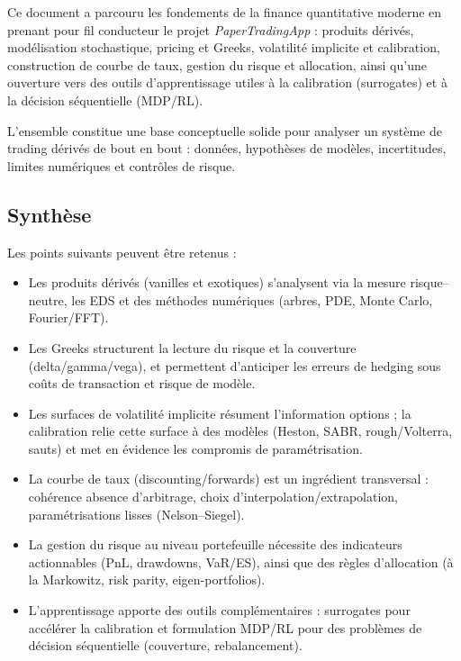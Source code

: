 \documentclass[11pt,a4paper]{article}
\newcommand{\1}{\mathbf{1}}
\begin{document}
Ce document a parcouru les fondements de la finance quantitative moderne en prenant pour fil conducteur le projet
\emph{PaperTradingApp} : produits d\'eriv\'es, mod\'elisation stochastique, pricing et Greeks, volatilit\'e implicite et
calibration, construction de courbe de taux, gestion du risque et allocation, ainsi qu'une ouverture vers des outils
d'apprentissage utiles \`a la calibration (surrogates) et \`a la d\'ecision s\'equentielle (MDP/RL).

L'ensemble constitue une base conceptuelle solide pour analyser un syst\`eme de trading d\'eriv\'es de bout en bout :
donn\'ees, hypoth\`eses de mod\`eles, incertitudes, limites num\'eriques et contr\^oles de risque.

\subsection{Synthèse}

Les points suivants peuvent \^etre retenus :

\begin{itemize}
  \item Les produits d\'eriv\'es (vanilles et exotiques) s'analysent via la mesure risque--neutre, les EDS et des
        m\'ethodes num\'eriques (arbres, PDE, Monte Carlo, Fourier/FFT).
  \item Les Greeks structurent la lecture du risque et la couverture (delta/gamma/vega), et permettent d'anticiper les
        erreurs de hedging sous co\^uts de transaction et risque de mod\`ele.
  \item Les surfaces de volatilit\'e implicite r\'esument l'information options ; la calibration relie cette surface \`a des
        mod\`eles (Heston, SABR, rough/Volterra, sauts) et met en \'evidence les compromis de param\'etrisation.
  \item La courbe de taux (discounting/forwards) est un ingr\'edient transversal : coh\'erence absence d'arbitrage,
        choix d'interpolation/extrapolation, param\'etrisations lisses (Nelson--Siegel).
  \item La gestion du risque au niveau portefeuille n\'ecessite des indicateurs actionnables (PnL, drawdowns, VaR/ES),
        ainsi que des r\`egles d'allocation (\`a la Markowitz, risk parity, eigen-portfolios).
  \item L'apprentissage apporte des outils compl\'ementaires : surrogates pour acc\'el\'erer la calibration et formulation
        MDP/RL pour des probl\`emes de d\'ecision s\'equentielle (couverture, rebalancement).
\end{itemize}
\end{document}
